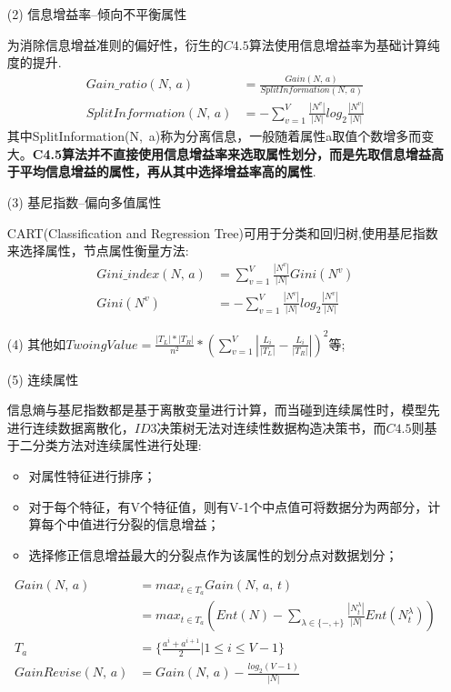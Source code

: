 \documentclass[a4paper]{article}
\begin{document}
\begin{enumerate}
\begin{itemize}
					\item[(2)] 信息增益率--倾向不平衡属性\par
						为消除信息增益准则的偏好性，衍生的$C4.5$算法使用信息增益率为基础计算纯度的提升.
						\begin{align*}
						Gain\_ratio(N,\,a) &= \frac{Gain(N,\,a)}{SplitInformation(N,\, a)}\\
						SplitInformation(N,\, a) &= - \sum_{v=1}^{V}\frac{|N^v|}{|N|}log_2\frac{|N^v|}{|N|}
						\end{align*}
						其中SplitInformation(N,\, a)称为分离信息，一般随着属性a取值个数增多而变大。\textbf{C4.5算法并不直接使用信息增益率来选取属性划分，而是先取信息增益高于平均信息增益的属性，再从其中选择增益率高的属性}.

					\item[(3)] 基尼指数--偏向多值属性\par
						CART(Classification and Regression Tree)可用于分类和回归树,使用基尼指数来选择属性，节点属性衡量方法:
						\begin{align*}
						Gini\_index(N,\,a) &= \sum_{v=1}^{V}\frac{|N^v|}{|N|}Gini(N^v)\\
						Gini(N^v) &= - \sum_{v=1}^{V}\frac{|N^v|}{|N|}log_2\frac{|N^v|}{|N|}
						\end{align*}

					\item[(4)] 其他如$TwoingValue = \frac{|T_L|*|T_R|}{n^2}*(\sum_{v=1}^{V}|\frac{L_i}{|T_L|}-\frac{L_i}{|T_R|}|)^2$等;\par

					\item[(5)] 连续属性\par

						信息熵与基尼指数都是基于离散变量进行计算，而当碰到连续属性时，模型先进行连续数据离散化，$ID3$决策树无法对连续性数据构造决策书，而$C4.5$则基于二分类方法对连续属性进行处理:
							\begin{itemize}
								\item 对属性特征进行排序；
								\item 对于每个特征，有V个特征值，则有V-1个中点值可将数据分为两部分，计算每个中值进行分裂的信息增益；
								\item 选择修正信息增益最大的分裂点作为该属性的划分点对数据划分；
							\end{itemize}
						\begin{align*}
							Gain(N,\,a) & = max_{t\in T_a} Gain(N,\,a,\,t)\\
										& = max_{t\in T_a} (Ent(N) - \sum_{\lambda \in \{-,+\}}\frac{|N_t^\lambda|}{|N|}Ent(N_t^\lambda))\\
									T_a	& = \{\frac{a^i+a^{i+1}}{2}|1\le i \le V-1\}\\
					  GainRevise(N,\,a) & = Gain(N,\,a) - \frac{log_2(V-1)}{|N|}\\
						\end{align*}


\end{itemize}
\end{enumerate}
\end{document}
